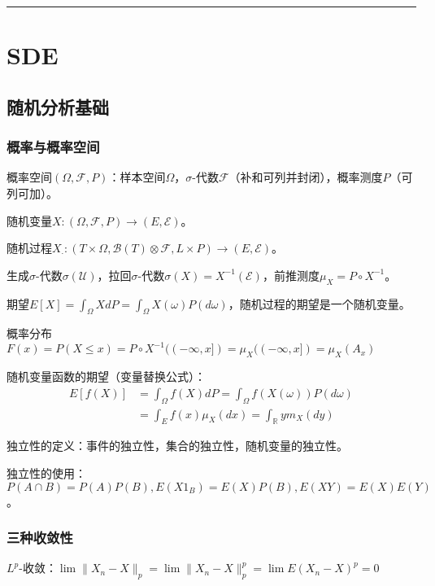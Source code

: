 \vspace{5pt} \hrule \vspace{5pt}

\chapter{SDE}

\section{随机分析基础}

\subsection{概率与概率空间}

概率空间$(\Omega, \mathcal{F}, P)$：样本空间$\Omega$，$\sigma$-代数$\mathcal{F}$（补和可列并封闭），概率测度$P$（可列可加）。

随机变量$X: (\Omega, \mathcal{F}, P) \to (E, \mathcal{E})$。

随机过程$X_{\cdot}: (T \times \Omega, \mathcal{B}(T) \otimes \mathcal{F}, L \times P) \to (E, \mathcal{E})$。

生成$\sigma$-代数$\sigma(\mathcal{U})$，拉回$\sigma$-代数$\sigma(X) = X^{-1}(\mathcal{E})$，前推测度$\mu_{X} = P \circ X^{-1}$。

期望$E[X] = \int_{\Omega} X dP = \int_{\Omega} X(\omega) P(d\omega)$，随机过程的期望是一个随机变量。

概率分布$F(x) = P(X \le x) = P \circ X^{-1} ((-\infty, x]) = \mu_X((-\infty, x]) = \mu_X(A_x)$

随机变量函数的期望（变量替换公式）：
\[
  \begin{aligned}
    E[f(X)] &= \int_{\Omega} f(X) dP = \int_{\Omega} f(X(\omega)) P(d\omega)\\ &= \int_{E} f(x) \mu_X(dx) = \int_{\mathbb{R}} y m_X(dy)
  \end{aligned}
\]

独立性的定义：事件的独立性，集合的独立性，随机变量的独立性。

独立性的使用：$P(A \cap B) = P(A) P(B), E(X 1_B) = E(X) P(B), E(XY) = E(X) E(Y)$。

\subsection{三种收敛性}

$L^p$-收敛：$\lim \|X_n - X\|_p = \lim \|X_n - X\|_p^p = \lim E(X_n - X)^p = 0$

